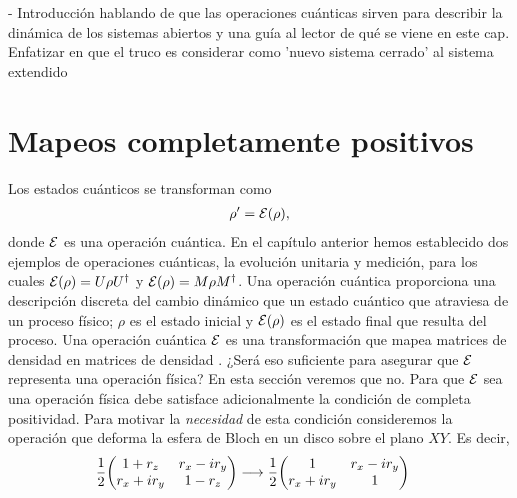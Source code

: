 - Introducción hablando de que las operaciones cuánticas sirven 
para describir la dinámica de los sistemas abiertos y una guía al 
lector de qué se viene en este cap. Enfatizar en que el truco es 
considerar como 'nuevo sistema cerrado' al sistema extendido
\section{Mapeos completamente positivos}
Los estados cuánticos se transforman como \cite{nielsen_chuang_2011}
\begin{align}
\rho' = \mathcal{E} (\rho)
\label{eq:E(rho)},
\end{align} 
donde $\mathcal{E}$ es una operación cuántica. En el capítulo anterior hemos 
establecido dos ejemplos de operaciones cuánticas, la evolución unitaria 
y medición, para los cuales $\mathcal{E} \qty(\rho)=U\rho U^{\dagger}$ y 
$\mathcal{E}(\rho)=M\rho M^{\dagger}$. Una operación cuántica proporciona
una descripción discreta del cambio dinámico que un estado cuántico 
que atraviesa de un proceso físico; $\rho$ es el estado inicial y $\mathcal{E} (\rho)$ es el 
estado final que resulta del proceso. Una operación cuántica $\mathcal{E}$ es
una transformación que mapea matrices de densidad en matrices 
de densidad \cite{bengtsson_zyczkowski_2017}. ¿Será eso
suficiente para asegurar que $\mathcal{E}$ representa una operación física? En esta 
sección veremos que no.  Para que $\mathcal{E}$ sea una operación física 
debe satisface adicionalmente la condición de completa positividad. Para 
motivar la \textit{necesidad} de esta condición consideremos la operación 
que deforma la esfera de Bloch en un disco sobre el plano $XY$. Es decir,
\begin{align}
\frac{1}{2}\mqty(1+r_z&r_x-ir_y\\r_x+ir_y&1-r_z) &\longrightarrow
\frac{1}{2}\mqty(1&r_x-ir_y\\r_x+ir_y&1)
\end{align}
